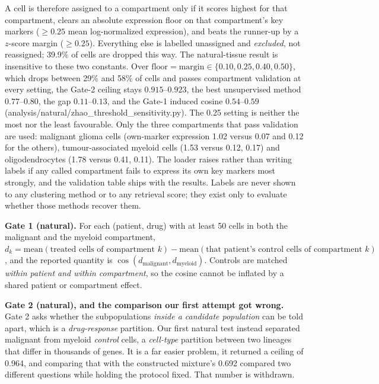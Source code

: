 \documentclass[11pt,letterpaper]{article}
\begin{document}
A cell is therefore assigned to a compartment only if it scores highest for that compartment,
clears an absolute expression floor on that compartment's key markers ($\geq 0.25$ mean
log-normalized expression), and beats the runner-up by a $z$-score margin ($\geq 0.25$). Everything
else is labelled unassigned and \emph{excluded}, not reassigned; 39.9\% of cells are dropped this
way. The natural-tissue result is insensitive to these two constants. Over
$\mathrm{floor}=\mathrm{margin}\in\{0.10,0.25,0.40,0.50\}$, which drops between 29\% and 58\% of
cells and passes compartment validation at every setting, the Gate-2 ceiling stays $0.915$--$0.923$,
the best unsupervised method $0.77$--$0.80$, the gap $0.11$--$0.13$, and the Gate-1 induced cosine
$0.54$--$0.59$ (analysis/natural/zhao\_threshold\_sensitivity.py). The 0.25 setting is neither the
most nor the least favourable. Only the three compartments that pass validation are used: malignant glioma cells (own-marker
expression 1.02 versus 0.07 and 0.12 for the others), tumour-associated myeloid cells (1.53 versus
0.12, 0.17) and oligodendrocytes (1.78 versus 0.41, 0.11). The loader raises rather than writing
labels if any called compartment fails to express its own key markers most strongly, and the
validation table ships with the results. Labels are never shown to any clustering method or to any
retrieval score; they exist only to evaluate whether those methods recover them.

\textbf{Gate 1 (natural).} For each (patient, drug) with at least 50 cells in both the malignant and
the myeloid compartment, $d_k = \mathrm{mean}(\text{treated cells of compartment }k) -
\mathrm{mean}(\text{that patient's control cells of compartment }k)$, and the reported quantity is
$\cos(d_{\mathrm{malignant}}, d_{\mathrm{myeloid}})$. Controls are matched \emph{within patient and
within compartment}, so the cosine cannot be inflated by a shared patient or compartment effect.

\textbf{Gate 2 (natural), and the comparison our first attempt got wrong.} Gate 2 asks whether the
subpopulations \emph{inside a candidate population} can be told apart, which is a
\emph{drug-response} partition. Our first natural test instead separated malignant from myeloid
\emph{control} cells, a \emph{cell-type} partition between two lineages that differ in thousands of
genes. It is a far easier problem, it returned a ceiling of 0.964, and comparing that with the
constructed mixture's 0.692 compared two different questions while holding the protocol fixed. That
number is withdrawn.
\end{document}
